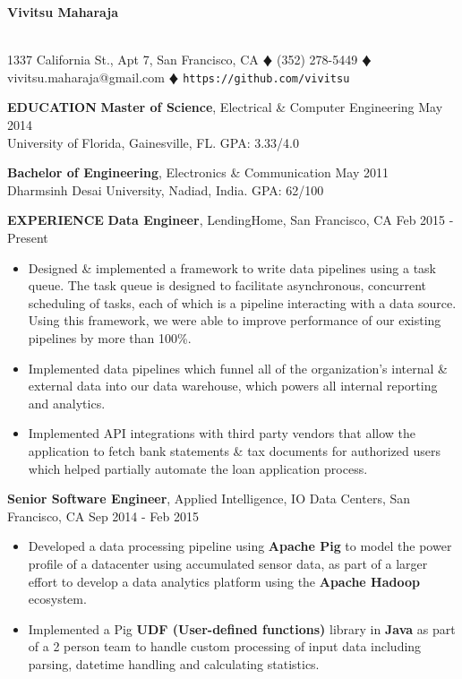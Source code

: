 \documentclass[10pt, letterpaper]{article}
\begin{document}
\begin{center}
\textbf{\Large Vivitsu Maharaja}
\date{}
\thispagestyle{empty}
\smallskip \\
1337 California St., Apt 7, San Francisco, CA $\vardiamond$ (352) 278-5449 $\vardiamond$ vivitsu.maharaja@gmail.com $\vardiamond$ \texttt{https://github.com/vivitsu}
\end{center}

\textbf{EDUCATION}
\smallskip
\newline
{\bf Master of Science}, Electrical \& Computer Engineering \hfill May 2014\\
University of Florida, Gainesville, FL. \hfill GPA: 3.33/4.0

{\bf Bachelor of Engineering}, Electronics \& Communication \hfill May 2011\\
Dharmsinh Desai University, Nadiad, India. \hfill GPA: 62/100

\textbf{EXPERIENCE}
\smallskip
\newline
\textbf{Data Engineer}, LendingHome, San Francisco, CA \hfill Feb 2015 - Present
\begin{itemize}
    \item Designed \& implemented a framework to write data pipelines using a task queue. The task queue is designed
  to facilitate asynchronous, concurrent scheduling of tasks, each of which is a pipeline interacting with a data source.
  Using this framework, we were able to improve performance of our existing pipelines by more than 100\%.
    \item Implemented data pipelines which funnel all of the organization's internal \& external data into our data warehouse,
  which powers all internal reporting and analytics.
    \item Implemented API integrations with third party vendors that allow the application to fetch bank statements \& tax documents
  for authorized users which helped partially automate the loan application process.
\end{itemize}  
\textbf{Senior Software Engineer}, Applied Intelligence, IO Data Centers, San Francisco, CA \hfill Sep 2014 - Feb 2015
\begin{itemize}
    \item Developed a data processing pipeline using \textbf{Apache Pig} to model 
the power profile of a datacenter using accumulated sensor data, as part of a larger effort to develop a data analytics
platform using the \textbf{Apache Hadoop} ecosystem.
    \item Implemented a Pig \textbf{UDF (User-defined functions)} library in \textbf{Java} as part of a 2 person team
to handle custom processing of input data including parsing, datetime handling and
calculating statistics.
\end{itemize}
\end{document}
